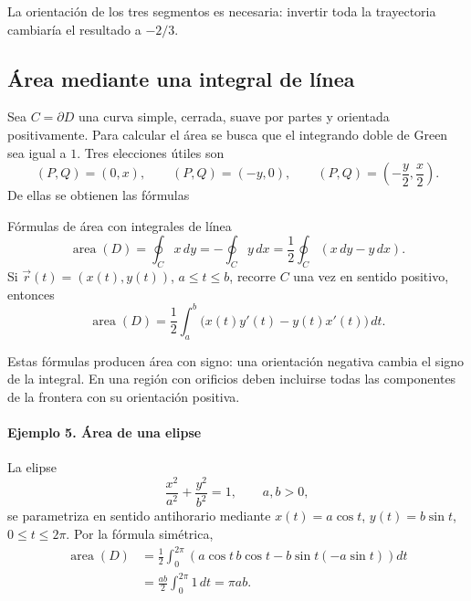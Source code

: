 \begingroup
\shorthandoff{>}
\begin{center}
\end{center}
\endgroup

La orientación de los tres segmentos es necesaria: invertir toda la trayectoria cambiaría el resultado a $-2/3$.

\subsection{Área mediante una integral de línea}

Sea $C=\partial D$ una curva simple, cerrada, suave por partes y orientada positivamente. Para calcular el área se busca que el integrando doble de Green sea igual a $1$. Tres elecciones útiles son
\[
(P,Q)=(0,x),\qquad(P,Q)=(-y,0),\qquad
(P,Q)=\left(-\frac y2,\frac x2\right).
\]
De ellas se obtienen las fórmulas
\begin{mytheorem}{Fórmulas de área con integrales de línea}
\[
\operatorname{area}(D)
=\oint_C x\,dy
=-\oint_C y\,dx
=\frac12\oint_C(x\,dy-y\,dx).
\]
Si $\vec r(t)=(x(t),y(t))$, $a\leq t\leq b$, recorre $C$ una vez en sentido positivo, entonces
\[
\operatorname{area}(D)
=\frac12\int_a^b\bigl(x(t)y'(t)-y(t)x'(t)\bigr)\,dt.
\]
\end{mytheorem}

Estas fórmulas producen área con signo: una orientación negativa cambia el signo de la integral. En una región con orificios deben incluirse todas las componentes de la frontera con su orientación positiva.

\paragraph{Ejemplo 5. Área de una elipse}
La elipse
\[
\frac{x^2}{a^2}+\frac{y^2}{b^2}=1,
\qquad a,b>0,
\]
se parametriza en sentido antihorario mediante $x(t)=a\cos t$, $y(t)=b\sin t$, $0\leq t\leq2\pi$. Por la fórmula simétrica,
\begin{align*}
\operatorname{area}(D)
&=\frac12\int_0^{2\pi}
\left(a\cos t\,b\cos t-b\sin t(-a\sin t)\right)dt\\
&=\frac{ab}{2}\int_0^{2\pi}1\,dt
=\pi ab.
\end{align*}

